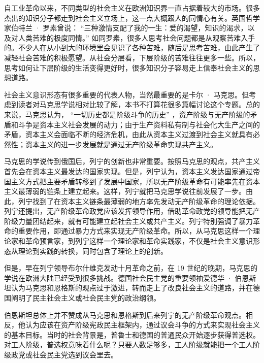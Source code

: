 自工业革命以来，不同类型的社会主义在欧洲知识界一直占据着较大的市场。很多杰出的知识分子都走到社会主义立场上，这一点大概跟人的同情心有关。英国哲学家伯特兰 · 罗素曾说： “三种激情支配了我的一生：爱的渴望，知识的渴求，以及对人类苦难的极度同情。” 如同罗素，很多人思考社会问题都是从观察苦难入手的。不少人在从小到大的环境里会见识了各种苦难，随后是思考苦难，由此产生了减轻社会苦难的积极愿望。从社会分层看，下层阶级的苦难往往更多一些。所以，思考如何让下层阶级的生活变得更好时，很多知识分子容易走上信奉社会主义的思想道路。


社会主义意识形态有很多重要的代表人物，当然最重要的是卡尔 · 马克思。但考虑到读者对马克思学说相对比较了解，本书不打算花很多篇幅讨论这个专题。总的来说，马克思认为， “一切历史都是阶级斗争的历史” ，资产阶级与无产阶级的矛盾和斗争是资本主义社会发展的动力；由于生产资料私有制与社会化大生产之间的矛盾，资本主义会面临不断的经济危机，由此从资本主义过渡到社会主义就具有必然性；资本主义的进一步发展就是通过无产阶级革命实现共产主义。

马克思的学说传到俄国后，列宁的创新也非常重要。按照马克思的观点，共产主义首先会在资本主义最发达的国家实现。但是，列宁认为，资本主义发达国家通过帝国主义方式把主要矛盾转移到了发展中国家，所以无产阶级革命有可能率先在资本主义最薄弱的链条上建立起来。这样，列宁就把马克思学说往前发展了一步。由此，列宁找到了在资本主义链条最薄弱的地方率先发动无产阶级革命的理论依据。列宁还提出，无产阶级革命政党应该发挥领导作用，借助革命政党的领导能把无产阶级力量团结起来，就有可能建立起社会主义或共产主义。列宁特别强调了暴力革命的重要作用，即通过暴力方式来实现无产阶级革命。所以，从马克思这样一个理论家和革命预言家，到列宁这样一个理论家和革命实践家，不仅是社会主义意识形态从理论到实践的转换，同时包含了理论上的创新。

但是，早在列宁领导布尔什维克发动十月革命之前，在 19 世纪的晚期，马克思的学说在欧洲大陆已经受到很多挑战。德国社会民主党的重要领袖爱德华 · 伯恩斯坦认为马克思和恩格斯的观点过于激进，转而走上了改良社会主义的道路，并在德国阐明了民主社会主义或社会民主党的政治纲领。

伯恩斯坦总体上并不赞成从马克思和恩格斯到后来列宁的无产阶级革命观点。相反，他认为应该在资产阶级宪政民主框架内，通过议会斗争的方式来实现社会主义的基本目标。当时的社会背景是，普鲁士和德国的普通民众开始逐步获得普选权。对工人阶级，普选权意味着什么呢？只要人数足够多，工人阶级就能把一个工人阶级政党或社会民主党选到议会里去。


